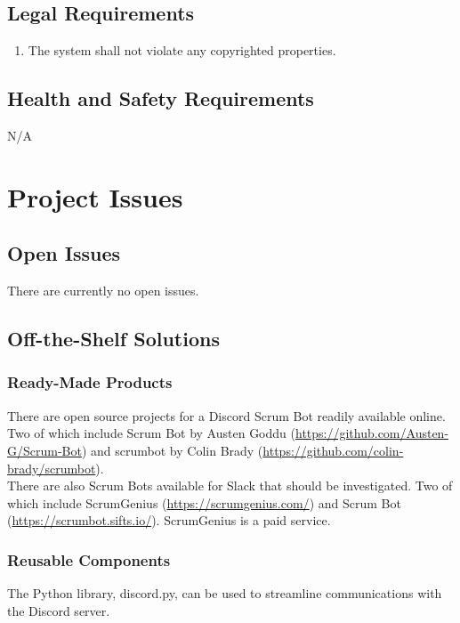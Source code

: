 \documentclass[12pt, titlepage]{article}
\begin{document}
\subsection{Legal Requirements}
\begin{enumerate}[start=1, label={L\arabic*.}]
    \item The system shall not violate any copyrighted properties.
\end{enumerate}

\subsection{Health and Safety Requirements}
N/A

\section{Project Issues}
\subsection{Open Issues}
There are currently no open issues.

\subsection{Off-the-Shelf Solutions}
\subsubsection{Ready-Made Products}
\noindent There are open source projects for a Discord Scrum Bot readily available online. Two of which include Scrum Bot by Austen Goddu (\url{https://github.com/Austen-G/Scrum-Bot}) and scrumbot by Colin Brady (\url{https://github.com/colin-brady/scrumbot}).\\

\noindent There are also Scrum Bots available for Slack that should be investigated. Two of which include ScrumGenius (\url{https://scrumgenius.com/}) and Scrum Bot (\url{https://scrumbot.sifts.io/}). ScrumGenius is a paid service.

\subsubsection{Reusable Components}
\noindent The Python library, discord.py, can be used to streamline communications with the Discord server.
\end{document}
